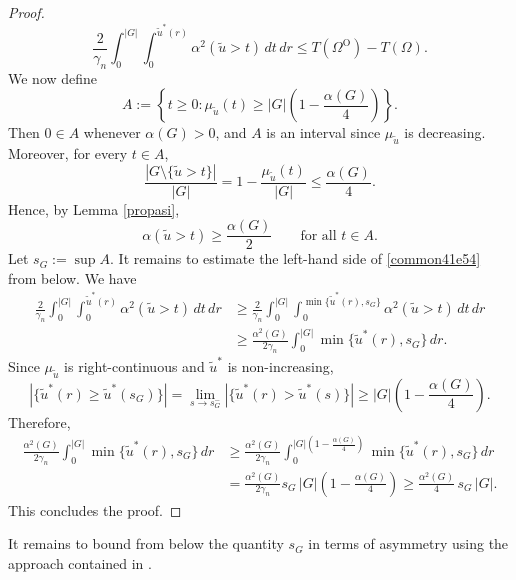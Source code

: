 \documentclass[oneside,a4paper,11pt,notitlepage]{article}
\theoremstyle{definition}
\theoremstyle{plain}
\theoremstyle{definition}
\begin{document}
\begin{proof}
\begin{equation}
\frac{2}{\gamma_n}\int_0^{|G|}\int_0^{\tilde u^*(r)} \alpha^2(\tilde u>t)\,dt\,dr
\leq T(\Omega^{\mathrm{O}}) - T(\Omega).
\end{equation}
We now define
\begin{equation*}
A := \left\{ t \geq 0 : \mu_{\tilde u}(t) \geq |G|\left(1-\frac{\alpha(G)}{4}\right) \right\}.
\end{equation*}
Then $0\in A$ whenever $\alpha(G)>0$, and $A$ is an interval since $\mu_{\tilde u}$ is decreasing. Moreover, for every $t\in A$,
\begin{equation*}
\frac{|G\setminus\{\tilde u>t\}|}{|G|}
= 1 - \frac{\mu_{\tilde u}(t)}{|G|}
\leq \frac{\alpha(G)}{4}.
\end{equation*}
Hence, by Lemma \ref{propasi},
\begin{equation*}
\alpha(\tilde u>t) \geq \frac{\alpha(G)}{2}
\qquad \text{for all } t\in A.
\end{equation*}
Let $s_G := \sup A$. It remains to estimate the left-hand side of \eqref{common41e54} from below. We have
\begin{equation*}
\begin{aligned}
\frac{2}{\gamma_n}\int_0^{|G|}\int_0^{\tilde u^*(r)} \alpha^2(\tilde u>t)\,dt\,dr
&\geq \frac{2}{\gamma_n}\int_0^{|G|}
\int_0^{\min\{\tilde u^*(r), s_G\}} \alpha^2(\tilde u>t)\,dt\,dr \\
&\geq \frac{\alpha^2(G)}{2\gamma_n}
\int_0^{|G|} \min\{\tilde u^*(r), s_G\}\,dr.
\end{aligned}
\end{equation*}
Since $\mu_{\tilde u}$ is right-continuous and $\tilde u^*$ is non-increasing,
\begin{equation*}
\left|\{\tilde u^*(r) \geq \tilde u^*(s_G)\}\right|
= \lim_{s\to s_G^-} |\{\tilde u^*(r) > \tilde u^*(s)\}|
\geq |G|\left(1-\frac{\alpha(G)}{4}\right).
\end{equation*}
Therefore,
\begin{equation*}
\begin{aligned}
\frac{\alpha^2(G)}{2\gamma_n}
\int_0^{|G|} \min\{\tilde u^*(r), s_G\}\,dr
&\geq \frac{\alpha^2(G)}{2\gamma_n}
\int_0^{|G|\left(1-\frac{\alpha(G)}{4}\right)}
\min\{\tilde u^*(r), s_G\}\,dr \\
&= \frac{\alpha^2(G)}{2\gamma_n}
s_G\,|G|\left(1-\frac{\alpha(G)}{4}\right)
\geq \frac{\alpha^2(G)}{4}\,s_G\,|G|.
\end{aligned}
\end{equation*}
This concludes the proof.
\end{proof}
It remains to bound from below the quantity $s_G$ in terms of asymmetry using the approach contained in \cite{Kim}. 
\end{document}

